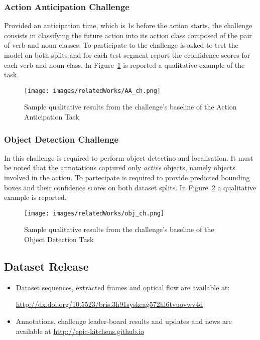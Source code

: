 \subsubsection{Action Anticipation Challenge}\label{sec:ep_AA_chall}
Provided an anticipation time, which is 1s before the action starts,
the challenge consists in classifying the future action into its action class
composed of the pair of verb and noun classes. To participate to the challenge is asked to test the model
on both splits and for each test segment report the econfidence 
scores for each verb and noun class. In Figure~\ref{fig:epic_aa_chall} is reported
a qualitative example of the task.
\begin{figure}[t]
    \centering
    \texttt{[image: images/relatedWorks/AA\_ch.png]} 
    \caption{Sample qualitative results from the challenge's baseline of the Action Anticipation Task}\label{fig:epic_aa_chall}
\end{figure}

 \subsubsection{Object Detection Challenge}
In this challenge is required to perform object detectino and localisation.
It must be noted that the annotations captured only \textit{active} objects, namely
objects involved in the action. To partecipate is required to provide predicted
bounding boxes and their confidence scores on both dataset splits. In Figure~\ref{fig:epic_od_chall}
a qualitative example is reported.

\begin{figure}[t]
    \centering
    \texttt{[image: images/relatedWorks/obj\_ch.png]} 
    \caption{Sample qualitative results from the challenge's baseline of the Object Detection Task}\label{fig:epic_od_chall}
\end{figure}

\subsection{Dataset Release}
\begin{itemize}
    \item Dataset sequences, extracted frames and optical flow are available at:
    
    \url{http://dx.doi.org/10.5523/bris.3h91syskeag572hl6tvuovwv4d}
    \item Annotations, challenge leader-board results and updates and news are available
    at \url{http://epic-kitchens.github.io}
\end{itemize}

